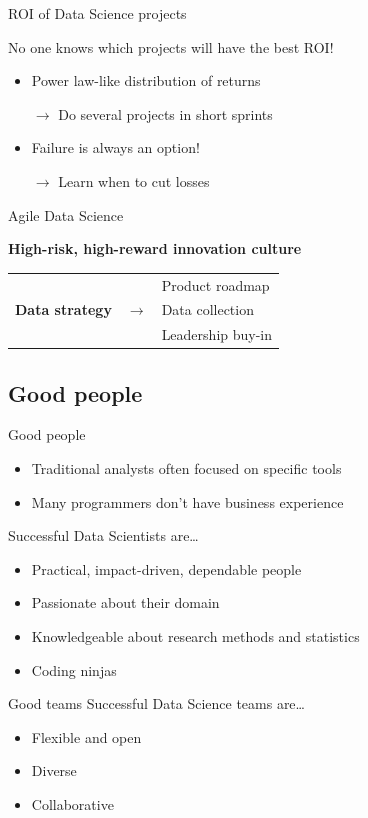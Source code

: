 \begin{frame}{ROI of Data Science projects}
    \begin{center}
        \large%
        No one knows which projects will have the best ROI!
    \end{center}
    \vfill
    \begin{itemize}
        \item Power law\hyp{}like distribution of returns
        \item[$\rightarrow$] Do several projects in short sprints
    \end{itemize}
    \begin{itemize}
        \item Failure is always an option!
        \item[$\rightarrow$] Learn when to cut losses
    \end{itemize}
\end{frame}

\begin{frame}{Agile Data Science}
    \begin{center}
        \Large%
        {\bf%
         High\hyp{}risk, high\hyp{}reward innovation culture}
        \vfill
        \begin{tabular}{rcl}
        \multirow{3}{*}{\textbf{Data strategy}} &       & Product roadmap \\
                                                & $\to$ & Data collection \\
                                                &       & Leadership buy\hyp{}in \\
        \end{tabular}
    \end{center}
\end{frame}

\subsection{Good people}

\begin{frame}{Good people}
    \begin{itemize}
        \item Traditional analysts often focused on specific tools
        \item Many programmers don't have business experience
    \end{itemize}
    \vfill\pause
    Successful Data Scientists are\ldots
    \begin{itemize}
        \item Practical, impact\hyp{}driven, dependable people
        \item Passionate about their domain
        \item Knowledgeable about research methods and statistics
        \item Coding ninjas
    \end{itemize}
\end{frame}

\begin{frame}{Good teams}
    Successful Data Science teams are\ldots
    \begin{itemize}
        \item Flexible and open
        \item Diverse
        \item Collaborative
    \end{itemize}
\end{frame}




